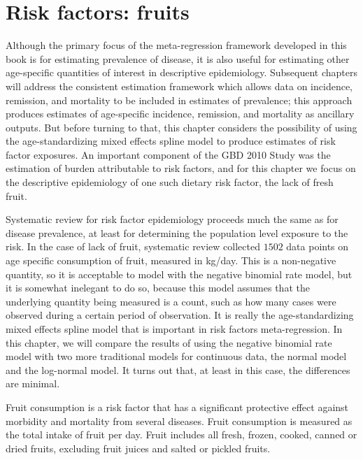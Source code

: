 \chapter{Risk factors: fruits}
\label{applications-log_normal}

Although the primary focus of the meta-regression framework developed
in this book is for estimating prevalence of disease, it is also
useful for estimating other age-specific quantities of interest in
descriptive epidemiology.  Subsequent chapters will address the
consistent estimation framework which allows data on incidence,
remission, and mortality to be included in estimates of prevalence;
this approach produces estimates of age-specific incidence, remission,
and mortality as ancillary outputs.  But before turning to that,
this chapter considers the possibility of using the
age-standardizing mixed effects spline model to produce estimates of
risk factor exposures.  An important component of the GBD 2010 Study
was the estimation of burden attributable to risk factors, and for
this chapter we focus on the descriptive epidemiology of one such
dietary risk factor, the lack of fresh fruit.  

Systematic review for
risk factor epidemiology proceeds much the same as for disease
prevalence, at least for determining the population level exposure to
the risk.  In the case of lack of fruit, systematic review collected
$1502$ data points on age specific consumption of fruit, measured in
kg/day.  This is a non-negative quantity, so it is acceptable to model
with the negative binomial rate model, but it is somewhat inelegant to
do so, because this model assumes that the underlying quantity being
measured is a count, such as how many cases were observed during a
certain period of observation.  It is really the age-standardizing
mixed effects spline model that is important in risk factors
meta-regression.  In this chapter, we will compare the results of
using the negative binomial rate model with two more traditional
models for continuous data, the normal model and the log-normal model.
It turns out that, at least in this case, the differences are minimal.

Fruit consumption is a risk factor that has a significant protective
effect against morbidity and mortality from several diseases.  Fruit
consumption is measured as the total intake of fruit per day.  Fruit
includes all fresh, frozen, cooked, canned or dried fruits, excluding
fruit juices and salted or pickled fruits. \cite{he_increased_2007,
  boeing_intake_2006}

